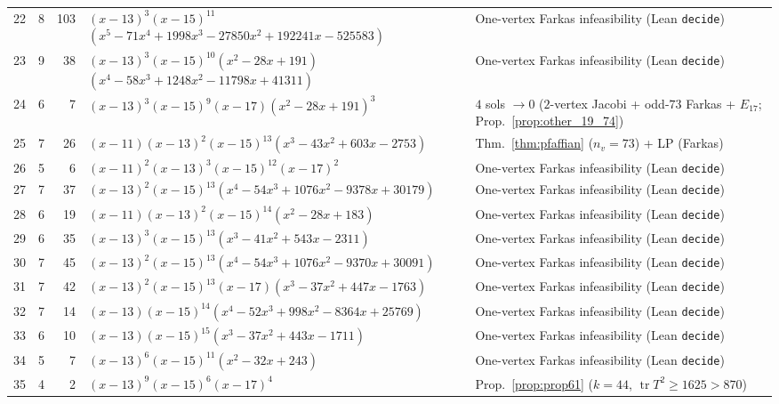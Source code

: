 \documentclass[11pt,reqno]{amsart}
\theoremstyle{definition}
\theoremstyle{remark}
\numberwithin{equation}{section}
\numberwithin{table}{section}
\DeclareMathOperator{\tr}{tr}
\begin{document}
{\begin{longtable}{@{}rrr>{\raggedright\arraybackslash}p{2.50in}>{\raggedright\arraybackslash}p{2.30in}@{}}
22 & 8 & 103 & $(x-13)^3$\allowbreak $(x-15)^{11}$\allowbreak $(x^5-71x^4+1998x^3-27850x^2+192241x-525583)$ & One-vertex Farkas infeasibility (Lean \texttt{decide}) \\
23 & 9 & 38 & $(x-13)^3$\allowbreak $(x-15)^{10}$\allowbreak $(x^2-28x+191)$\allowbreak $(x^4-58x^3+1248x^2-11798x+41311)$ & One-vertex Farkas infeasibility (Lean \texttt{decide}) \\
24 & 6 & 7 & $(x-13)^3$\allowbreak $(x-15)^9$\allowbreak $(x-17)$\allowbreak $(x^2-28x+191)^3$ & $4$ sols $\to 0$ ($2$-vertex Jacobi + odd-$73$ Farkas + $E_{17}$; Prop.~\ref{prop:other_19_74}) \\
25 & 7 & 26 & $(x-11)$\allowbreak $(x-13)^2$\allowbreak $(x-15)^{13}$\allowbreak $(x^3-43x^2+603x-2753)$ & Thm.~\ref{thm:pfaffian} ($n_v=73$) + LP (Farkas) \\
26 & 5 & 6 & $(x-11)^2$\allowbreak $(x-13)^3$\allowbreak $(x-15)^{12}$\allowbreak $(x-17)^2$ & One-vertex Farkas infeasibility (Lean \texttt{decide}) \\
27 & 7 & 37 & $(x-13)^2$\allowbreak $(x-15)^{13}$\allowbreak $(x^4-54x^3+1076x^2-9378x+30179)$ & One-vertex Farkas infeasibility (Lean \texttt{decide}) \\
28 & 6 & 19 & $(x-11)$\allowbreak $(x-13)^2$\allowbreak $(x-15)^{14}$\allowbreak $(x^2-28x+183)$ & One-vertex Farkas infeasibility (Lean \texttt{decide}) \\
29 & 6 & 35 & $(x-13)^3$\allowbreak $(x-15)^{13}$\allowbreak $(x^3-41x^2+543x-2311)$ & One-vertex Farkas infeasibility (Lean \texttt{decide}) \\
30 & 7 & 45 & $(x-13)^2$\allowbreak $(x-15)^{13}$\allowbreak $(x^4-54x^3+1076x^2-9370x+30091)$ & One-vertex Farkas infeasibility (Lean \texttt{decide}) \\
31 & 7 & 42 & $(x-13)^2$\allowbreak $(x-15)^{13}$\allowbreak $(x-17)$\allowbreak $(x^3-37x^2+447x-1763)$ & One-vertex Farkas infeasibility (Lean \texttt{decide}) \\
32 & 7 & 14 & $(x-13)$\allowbreak $(x-15)^{14}$\allowbreak $(x^4-52x^3+998x^2-8364x+25769)$ & One-vertex Farkas infeasibility (Lean \texttt{decide}) \\
33 & 6 & 10 & $(x-13)$\allowbreak $(x-15)^{15}$\allowbreak $(x^3-37x^2+443x-1711)$ & One-vertex Farkas infeasibility (Lean \texttt{decide}) \\
34 & 5 & 7 & $(x-13)^6$\allowbreak $(x-15)^{11}$\allowbreak $(x^2-32x+243)$ & One-vertex Farkas infeasibility (Lean \texttt{decide}) \\
35 & 4 & 2 & $(x-13)^9$\allowbreak $(x-15)^6$\allowbreak $(x-17)^4$ & Prop.~\ref{prop:prop61} ($k=44$, $\tr T^2 \ge 1625 > 870$) \\

\end{longtable}}
\end{document}
